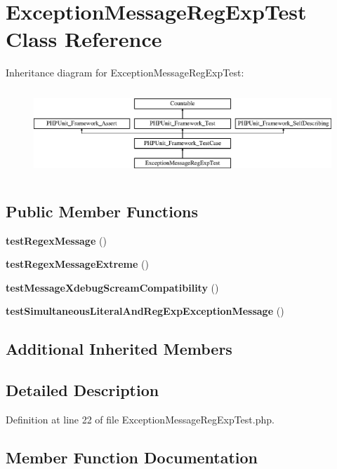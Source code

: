 \section{Exception\+Message\+Reg\+Exp\+Test Class Reference}
\label{class_exception_message_reg_exp_test}
Inheritance diagram for Exception\+Message\+Reg\+Exp\+Test\+:\begin{figure}[H]
\begin{center}
\leavevmode
\includegraphics[height=3.303835cm]{class_exception_message_reg_exp_test}
\end{center}
\end{figure}
\subsection*{Public Member Functions}
\begin{DoxyCompactItemize}
\item 
{\bf test\+Regex\+Message} ()
\item 
{\bf test\+Regex\+Message\+Extreme} ()
\item 
{\bf test\+Message\+Xdebug\+Scream\+Compatibility} ()
\item 
{\bf test\+Simultaneous\+Literal\+And\+Reg\+Exp\+Exception\+Message} ()
\end{DoxyCompactItemize}
\subsection*{Additional Inherited Members}


\subsection{Detailed Description}


Definition at line 22 of file Exception\+Message\+Reg\+Exp\+Test.\+php.



\subsection{Member Function Documentation}
